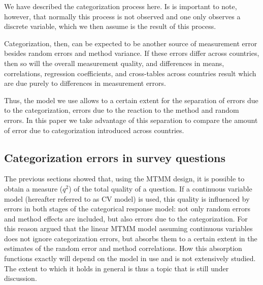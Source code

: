 \documentclass[a4paper,12pt]{article}
\begin{document}
We have described the categorization process here. Is is important to note, however, that normally this process is not observed and one only observes a discrete variable, which we then assume is the result of this process.

Categorization, then, can be expected to be another source of measurement error besides random errors and method variance. If these errors differ across countries, then so will the overall measurement quality, and differences in means, correlations, regression coefficients, and cross-tables across countries result which are due purely to differences in measurement errors.

Thus, the model we use allows to a certain extent for the separation of errors due to the categorization, errors due to the reaction to the method and random errors. In this paper we take advantage of this separation to compare the amount of error due to categorization introduced across countries. 

\subsection{Categorization errors in survey questions}

The previous sections showed that, using the MTMM design, it is possible to obtain a measure ($q^2$) of the total quality of a question. If a continuous variable model (hereafter referred to as CV model) is used, this quality is influenced by errors in both stages of the categorical response model: not only random errors and method effects are included, but also errors due to the categorization. For this reason \citet{coenders_structural_1996} argued that the linear MTMM model assuming continuous variables does not ignore categorization errors, but absorbs them to a certain extent in the estimates of the random error and method correlations. How this absorption functions exactly will depend on the model in use and is not extensively studied. The extent to which it holds in general is thus a topic that is still under discussion.
\end{document}
